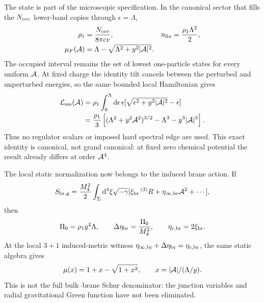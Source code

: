 \documentclass[10pt]{article}
\newcommand{\dd}{\mathrm{d}}
\begin{document}
The state is part of the microscopic specification.  In the canonical sector
that fills the $N_{\rm occ}$ lower-band copies through $\epsilon=\Lambda$,
\begin{equation}
 \begin{aligned}
 \rho_1&=\frac{N_{\rm occ}}{8\pi cv},&
 n_{\rm fix}&=\frac{\rho_1\Lambda^2}{2},\\
 \mu_F({\cal A})&=\Lambda-\sqrt{\Lambda^2+y^2|{\cal A}|^2}.
 \end{aligned}
 \label{eq:tiltedsemimetalfilling}
\end{equation}
The occupied interval remains the set of lowest one-particle states for every
uniform ${\cal A}$.  At fixed charge the identity tilt cancels between the
perturbed and unperturbed energies, so the same bounded local Hamiltonian gives
\begin{equation}
 \begin{split}
 {\cal L}_{\rm sm}({\cal A})
 &=\rho_1\int_0^\Lambda\dd\epsilon\,\epsilon
 [\sqrt{\epsilon^2+y^2|{\cal A}|^2}-\epsilon]\\
 &=\frac{\rho_1}{3}\left[(\Lambda^2+y^2{\cal A}^2)^{3/2}
 -\Lambda^3-y^3|{\cal A}|^3\right].
 \end{split}
 \label{eq:tiltedsemimetalbracket}
\end{equation}
Thus no regulator scalars or imposed hard spectral edge are used.  This exact
identity is canonical, not grand canonical: at fixed zero chemical potential
the result already differs at order ${\cal A}^4$.

The local static normalization now belongs to the induced brane action.  If
\begin{equation}
 S_{\rm br,g}=\frac{M_4^2}{2}\int_\Sigma\dd^4\xi\sqrt{-\gamma}
 [\xi_{\rm br}\,{}^{(3)}R+\eta_{\infty,{\rm br}}{\cal A}^2+\cdots],
 \label{eq:tiltedsemimetalbranegravity}
\end{equation}
then
\begin{equation}
 \Pi_0=\rho_1y^2\Lambda,\qquad
 \Delta\eta_{\rm br}=\frac{\Pi_0}{M_4^2},\qquad
 \eta_{c,{\rm br}}=2\xi_{\rm br}.
 \label{eq:tiltedsemimetalnormalization}
\end{equation}
At the local $3+1$ induced-metric witness
$\eta_{\infty,{\rm br}}+\Delta\eta_{\rm br}=\eta_{c,{\rm br}}$, the same static
algebra gives
\begin{equation}
 \mu(x)=1+x-\sqrt{1+x^2},\qquad x=|{\cal A}|/(\Lambda/y).
 \label{eq:tiltedsemimetalmu}
\end{equation}
This is not the full bulk--brane Schur denominator: the junction variables and
radial gravitational Green function have not been eliminated.
\end{document}
